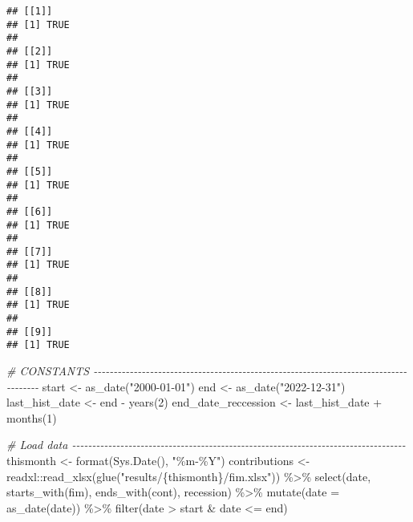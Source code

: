 \documentclass[
]{article}
\newenvironment{Shaded}{\begin{snugshade}}{\end{snugshade}}
\newcommand{\AttributeTok}[1]{\textcolor[rgb]{0.77,0.63,0.00}{#1}}
\newcommand{\CommentTok}[1]{\textcolor[rgb]{0.56,0.35,0.01}{\textit{#1}}}
\newcommand{\DecValTok}[1]{\textcolor[rgb]{0.00,0.00,0.81}{#1}}
\newcommand{\FunctionTok}[1]{\textcolor[rgb]{0.00,0.00,0.00}{#1}}
\newcommand{\NormalTok}[1]{#1}
\newcommand{\OtherTok}[1]{\textcolor[rgb]{0.56,0.35,0.01}{#1}}
\newcommand{\SpecialCharTok}[1]{\textcolor[rgb]{0.00,0.00,0.00}{#1}}
\newcommand{\StringTok}[1]{\textcolor[rgb]{0.31,0.60,0.02}{#1}}
\begin{document}
\begin{verbatim}
## [[1]]
## [1] TRUE
## 
## [[2]]
## [1] TRUE
## 
## [[3]]
## [1] TRUE
## 
## [[4]]
## [1] TRUE
## 
## [[5]]
## [1] TRUE
## 
## [[6]]
## [1] TRUE
## 
## [[7]]
## [1] TRUE
## 
## [[8]]
## [1] TRUE
## 
## [[9]]
## [1] TRUE
\end{verbatim}

\begin{Shaded}
\begin{Highlighting}[]
\CommentTok{\# CONSTANTS {-}{-}{-}{-}{-}{-}{-}{-}{-}{-}{-}{-}{-}{-}{-}{-}{-}{-}{-}{-}{-}{-}{-}{-}{-}{-}{-}{-}{-}{-}{-}{-}{-}{-}{-}{-}{-}{-}{-}{-}{-}{-}{-}{-}{-}{-}{-}{-}{-}{-}{-}{-}{-}{-}{-}{-}{-}{-}{-}{-}{-}{-}{-}{-}{-}{-}{-}{-}{-}{-}{-}{-}{-}{-}{-}{-}{-}{-}{-}{-}{-}{-}{-}{-}{-}{-}}
\NormalTok{start }\OtherTok{\textless{}{-}} \FunctionTok{as\_date}\NormalTok{(}\StringTok{"2000{-}01{-}01"}\NormalTok{)}
\NormalTok{end }\OtherTok{\textless{}{-}} \FunctionTok{as\_date}\NormalTok{(}\StringTok{"2022{-}12{-}31"}\NormalTok{)}
\NormalTok{last\_hist\_date }\OtherTok{\textless{}{-}}\NormalTok{ end }\SpecialCharTok{{-}} \FunctionTok{years}\NormalTok{(}\DecValTok{2}\NormalTok{)}
\NormalTok{end\_date\_reccession }\OtherTok{\textless{}{-}}\NormalTok{ last\_hist\_date }\SpecialCharTok{+} \FunctionTok{months}\NormalTok{(}\DecValTok{1}\NormalTok{)}

\CommentTok{\# Load data {-}{-}{-}{-}{-}{-}{-}{-}{-}{-}{-}{-}{-}{-}{-}{-}{-}{-}{-}{-}{-}{-}{-}{-}{-}{-}{-}{-}{-}{-}{-}{-}{-}{-}{-}{-}{-}{-}{-}{-}{-}{-}{-}{-}{-}{-}{-}{-}{-}{-}{-}{-}{-}{-}{-}{-}{-}{-}{-}{-}{-}{-}{-}{-}{-}{-}{-}{-}{-}{-}{-}{-}{-}{-}{-}{-}{-}{-}{-}{-}{-}{-}{-}}
\NormalTok{thismonth }\OtherTok{\textless{}{-}} \FunctionTok{format}\NormalTok{(}\FunctionTok{Sys.Date}\NormalTok{(), }\StringTok{"\%m{-}\%Y"}\NormalTok{)}
\NormalTok{contributions }\OtherTok{\textless{}{-}} 
\NormalTok{  readxl}\SpecialCharTok{::}\FunctionTok{read\_xlsx}\NormalTok{(}\FunctionTok{glue}\NormalTok{(}\StringTok{"results/\{thismonth\}/fim.xlsx"}\NormalTok{)) }\SpecialCharTok{\%\textgreater{}\%}
  \FunctionTok{select}\NormalTok{(date, }\FunctionTok{starts\_with}\NormalTok{(}\StringTok{\textquotesingle{}fim\textquotesingle{}}\NormalTok{), }\FunctionTok{ends\_with}\NormalTok{(}\StringTok{\textquotesingle{}cont\textquotesingle{}}\NormalTok{), recession) }\SpecialCharTok{\%\textgreater{}\%}
  \FunctionTok{mutate}\NormalTok{(}\AttributeTok{date =} \FunctionTok{as\_date}\NormalTok{(date)) }\SpecialCharTok{\%\textgreater{}\%} 
  \FunctionTok{filter}\NormalTok{(date }\SpecialCharTok{\textgreater{}}\NormalTok{ start }\SpecialCharTok{\&}\NormalTok{ date }\SpecialCharTok{\textless{}=}\NormalTok{ end)}


\end{Highlighting}
\end{Shaded}
\end{document}
